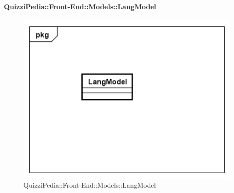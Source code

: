 		\paragraph{QuizziPedia::Front-End::Models::LangModel}
		
		\label{QuizziPedia::Front-End::Models::LangModel}
		
		\begin{figure}[h]
			\centering
			\includegraphics[scale=0.5,keepaspectratio]{UML/Classi/Front-End/QuizziPedia_Front-end_Models_LangModel.png}
			\caption{QuizziPedia::Front-End::Models::LangModel}
		\end{figure}
		
